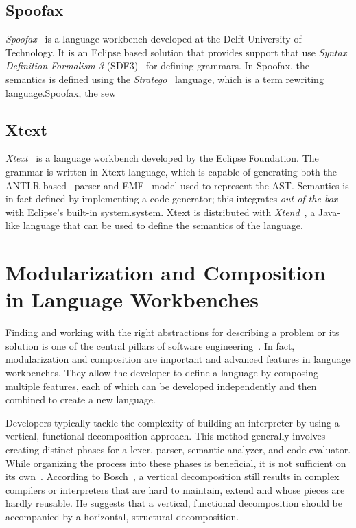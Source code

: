 \subsection{Spoofax}\label{subsec:related-work:spoofax}

\textit{Spoofax}~\cite{Visser10} is a language workbench developed at the Delft University of Technology. It is an Eclipse based solution that provides support that use \textit{Syntax Definition Formalism 3} (SDF3)~\cite{Heering89c} for defining grammars.
In Spoofax, the semantics is defined using the \textit{Stratego}~\cite{Visser01} language, which is a term rewriting language.Spoofax, the sew

\subsection{Xtext}\label{subsec:related-work:xtext}

\textit{Xtext}~\cite{Bettini13b} is a language workbench developed by the Eclipse Foundation. The grammar is written in Xtext language, which is capable of generating both the ANTLR-based~\cite{Parr95} parser and EMF~\cite{Steinberg08} model used to represent the AST.  Semantics is in fact defined by implementing a code generator; this integrates \textit{out of the box} with Eclipse's built-in system.system. Xtext is distributed with \textit{Xtend}~\cite{Bettini13b}, a Java-like language that can be used to define the semantics of the language.

\section{Modularization and Composition in Language Workbenches}\label{sec:related-work:modularization}
Finding and working with the right abstractions for describing a problem or its solution is one of the central pillars of software engineering~\cite{Voelter12}.
In fact, modularization and composition are important and advanced features in language workbenches. They allow the developer to define a language by composing multiple features, each of which can be developed independently and then combined to create a new language.

Developers typically tackle the complexity of building an interpreter by using a vertical, functional decomposition approach. This method generally involves creating distinct phases for a lexer, parser, semantic analyzer, and code evaluator. While organizing the process into these phases is beneficial, it is not sufficient on its own~\cite{Cazzola16e}.
According to Bosch~\cite{Bosch96}, a vertical decomposition still results in complex compilers or interpreters that are hard to maintain, extend and whose pieces are hardly reusable. He suggests that a vertical, functional decomposition should be accompanied by a horizontal, structural decomposition.

